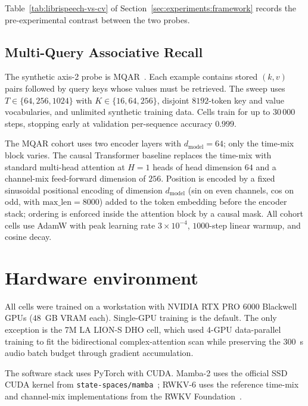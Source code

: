 Table~\ref{tab:librispeech-vs-cv} of
Section~\ref{sec:experiments:framework} records the
pre-experimental contrast between the two probes.

\subsection{Multi-Query Associative Recall}\label{app:setup:mqar}

The synthetic axis-2 probe is
MQAR~\citep{arora2023zoology}. Each example contains stored
$(k, v)$ pairs followed by query keys whose values must be
retrieved. The sweep uses $T \in \{64, 256, 1024\}$ with
$K \in \{16, 64, 256\}$, disjoint $8192$-token key and value
vocabularies, and unlimited synthetic training data. Cells train
for up to $30\,000$ steps, stopping early at validation
per-sequence accuracy $0.999$.

The MQAR cohort uses two encoder layers with
$d_{\text{model}} = 64$; only the time-mix block varies. The
causal Transformer baseline replaces the time-mix with standard
multi-head attention at $H = 1$ heads of head dimension $64$ and
a channel-mix feed-forward dimension of $256$. Position is
encoded by a fixed sinusoidal positional encoding of dimension
$d_{\text{model}}$ (sin on even channels, cos on odd, with
$\mathrm{max\_len} = 8000$) added to the token embedding before
the encoder stack; ordering is enforced inside the attention
block by a causal mask. All cohort cells use AdamW with peak
learning rate $3 \times 10^{-4}$, $1000$-step linear warmup, and
cosine decay.

\section{Hardware environment}\label{app:setup:hw}

All cells were trained on a workstation with NVIDIA RTX PRO 6000
Blackwell GPUs ($48$~GB VRAM each). Single-GPU training is the
default. The only exception is the 7M LA LION-S DHO cell, which
used 4-GPU data-parallel training to fit the bidirectional
complex-attention scan while preserving the $300$~s audio batch
budget through gradient accumulation.

The software stack uses PyTorch with CUDA. Mamba-2 uses the
official SSD CUDA kernel from
\texttt{state-spaces/mamba}~\cite{gu2024mambacode}; RWKV-6 uses
the reference time-mix and channel-mix implementations from the
RWKV Foundation~\cite{rwkv2024block}.

